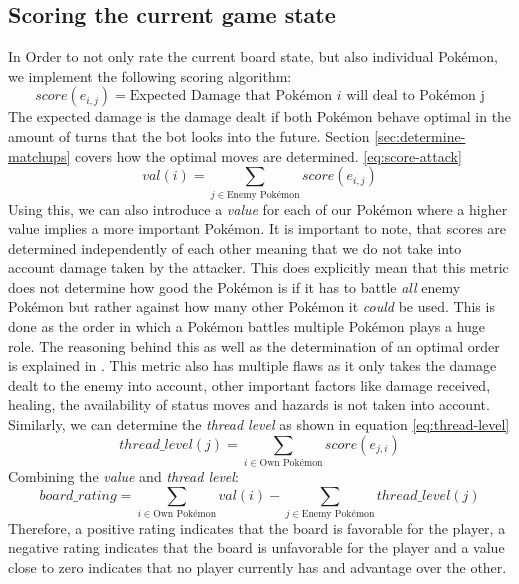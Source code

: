 \subsection{Scoring the current game state}
In Order to not only rate the current board state, but also individual Pokémon, we implement the following scoring 
algorithm:
\begin{equation}
\label{eq:score-attack}
	score(e_{i, j}) = \text{Expected Damage that Pokémon } i \text{ will deal to Pokémon j}
\end{equation}
The expected damage is the damage dealt if both Pokémon behave optimal in the amount of turns that the bot looks into
the future. Section \ref{sec:determine-matchups} covers how the optimal moves are determined.
\ref{eq:score-attack}
\begin{equation}
	val(i) = \sum_{j \in \text{Enemy Pokémon}} score(e_{i, j})
\end{equation}
Using this, we can also introduce a \textit{value} for each of our Pokémon where a higher value implies a more important
Pokémon. It is important to note, that scores are determined independently of each other meaning that we do not take
into account damage taken by the attacker. This does explicitly mean that this metric does not determine how good the 
Pokémon is if it has to battle \textit{all} enemy Pokémon but rather against how many other Pokémon it \textit{could}
be used. This is done as the order in which a Pokémon battles multiple Pokémon plays a huge role. The reasoning
behind this as well as the determination of an optimal order is explained in .
This metric also has multiple flaws as it only takes the damage dealt to the enemy into account, other important 
factors like damage received, healing, the availability of status moves and hazards is not taken into account. \\
Similarly, we can determine the \textit{thread level} as shown in equation \ref{eq:thread-level}
\begin{equation}
\label{eq:thread-level}
	thread\_level(j) = \sum_{i \in \text{Own Pokémon}} score(e_{j, i})
\end{equation}
Combining the \textit{value} and \textit{thread level}:
\begin{equation}
	board\_rating = \sum_{i \in \text{Own Pokémon}} val(i) - \sum_{j \in \text{Enemy Pokémon}} thread\_level(j)
\end{equation}
Therefore, a positive rating indicates that the board is favorable for the player, a negative rating indicates that
the board is unfavorable for the player and a value close to zero indicates that no player currently has and
advantage over the other.

